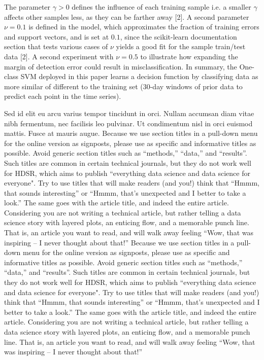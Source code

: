 \documentclass[]{hdsr}
\begin{document}
The parameter $\gamma>0$ defines the influence of each training sample i.e. a smaller $\gamma$ affects other samples less, as they can be farther away [2]. A second parameter $\nu=0.1$ is defined in the model, which approximates the fraction of training errors and support vectors, and is set at $0.1$, since the scikit-learn documentation section that tests various cases of $\nu$ yields a good fit for the sample train/test data [2]. A second experiment with $\nu=0.5$ to illustrate how expanding the margin of detection error could result in misclassification. In summary, the One-class SVM deployed in this paper learns a decision function by classifying data as more similar of different to the training set (30-day windows of prior data to predict each point in the time series).

Sed id elit eu arcu varius tempor tincidunt in orci. Nullam accumsan diam vitae nibh fermentum, nec facilisis leo pulvinar. Ut condimentum nisl in orci euismod mattis. Fusce at mauris augue. Because we use section titles in a pull-down menu for the online version as signposts, please use as specific and informative titles as possible. Avoid generic section titles such as ``methods,'' ``data,'' and ``results''. Such titles are common in certain technical journals, but they do not work well for HDSR, which aims to publish ``everything data science and data science for everyone". Try to use titles that will make readers (and you!) think that ``Hmmm, that sounds interesting'' or ``Hmmm, that's unexpected and I better to take a look.''   The same goes with the article title, and indeed the entire article.  Considering you are not writing a technical article, but rather telling a data science story with layered plots, an enticing flow, and a memorable punch line. That is, an article you want to read, and will walk away feeling ``Wow, that was inspiring -- I never thought about that!'' Because we use section titles in a pull-down menu for the online version as signposts, please use as specific and informative titles as possible. Avoid generic section titles such as ``methods,'' ``data,'' and ``results''. Such titles are common in certain technical journals, but they do not work well for HDSR, which aims to publish ``everything data science and data science for everyone". Try to use titles that will make readers (and you!) think that ``Hmmm, that sounds interesting'' or ``Hmmm, that's unexpected and I better to take a look.''   The same goes with the article title, and indeed the entire article.  Considering you are not writing a technical article, but rather telling a data science story with layered plots, an enticing flow, and a memorable punch line. That is, an article you want to read, and will walk away feeling ``Wow, that was inspiring -- I never thought about that!'' 
\end{document}
